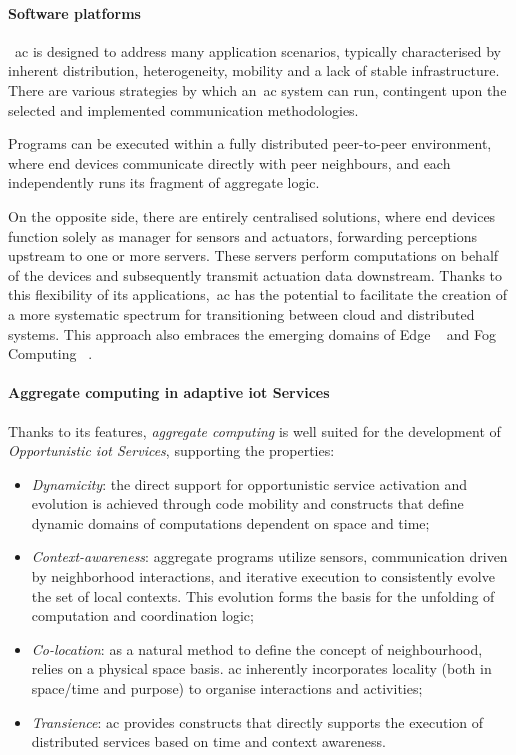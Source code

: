 \paragraph{Software platforms}
~\ac{ac} is designed to address many application scenarios, typically characterised by inherent distribution, heterogeneity,
mobility and a lack of stable infrastructure.
There are various strategies by which an~\ac{ac} system can run, contingent upon the selected and implemented
communication methodologies.

Programs can be executed within a fully distributed peer-to-peer environment, where end devices communicate directly
with peer neighbours, and each independently runs its fragment of aggregate logic.

On the opposite side, there are entirely centralised solutions, where end devices function solely as manager for sensors
and actuators, forwarding perceptions upstream to one or more servers.
These servers perform computations on behalf of the devices and subsequently transmit actuation data downstream.
Thanks to this flexibility of its applications,~\ac{ac} has the potential to facilitate the creation of a more systematic
spectrum for transitioning between cloud and distributed systems.
This approach also embraces the emerging domains of Edge ~\cite{8795355} and Fog Computing ~\cite{bdcc2020010}.

\paragraph{Aggregate computing in adaptive \ac{iot} Services}
Thanks to its features, \emph{aggregate computing} is well suited for the development of \emph{Opportunistic \ac{iot}
Services}, supporting the properties:
\begin{itemize}
    \item \emph{Dynamicity}: the direct support for opportunistic service activation and evolution is achieved through
        code mobility and constructs that define dynamic domains of computations dependent on space and time;
    \item \emph{Context-awareness}: aggregate programs utilize sensors, communication driven by neighborhood interactions,
        and iterative execution to consistently evolve the set of local contexts.
        This evolution forms the basis for the unfolding of computation and coordination logic;
    \item \emph{Co-location}: as a natural method to define the concept of neighbourhood, relies on a physical space basis.
        \ac{ac} inherently incorporates locality (both in space/time and purpose) to organise interactions and activities;
    \item \emph{Transience}: \ac{ac} provides constructs that directly supports the execution of distributed services
        based on time and context awareness.
\end{itemize}

